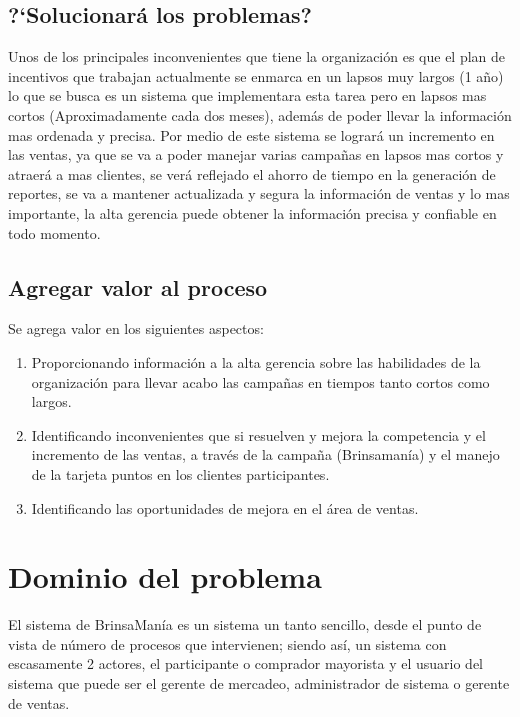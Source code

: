 \subsection{?`Solucionar\'a los problemas?}
Unos de los principales inconvenientes que tiene la organizaci\'on es que el plan de incentivos que trabajan actualmente  se enmarca en un lapsos muy largos  (1 a\~no) lo que se busca es un sistema que implementara esta tarea pero en lapsos mas cortos (Aproximadamente cada dos meses), adem\'as de poder llevar la informaci\'on mas ordenada y precisa. Por medio de este sistema se lograr\'a un  incremento en  las ventas, ya que se va a poder manejar varias campa\~nas en lapsos mas cortos y atraer\'a a mas clientes, se ver\'a reflejado el ahorro de tiempo en la generaci\'on de reportes, se va a mantener actualizada y segura la informaci\'on de ventas y lo mas importante, la alta gerencia puede obtener la informaci\'on precisa y confiable en todo momento.%
%
\subsection{Agregar valor al proceso}
Se agrega valor en los siguientes aspectos:%
\begin{enumerate}
	\item Proporcionando informaci\'on a la alta gerencia sobre las habilidades de la organizaci\'on para llevar acabo las campa\~nas en tiempos tanto cortos como largos.
	\item Identificando inconvenientes que si resuelven y mejora la competencia y el incremento de las ventas, a trav\'es de la campa\~na (Brinsaman\'ia) y  el manejo de la tarjeta puntos en los clientes participantes.
	\item Identificando las oportunidades de mejora en el \'area de ventas.
\end{enumerate}%
%
\section{Dominio del problema}
El sistema de BrinsaMan\'ia es un sistema un tanto sencillo, desde el punto de vista de n\'umero de procesos que intervienen; siendo as\'i, un sistema con escasamente 2 actores, el participante o comprador mayorista y el usuario del sistema que puede ser el gerente de mercadeo, administrador de sistema o gerente de ventas.%
%
%
